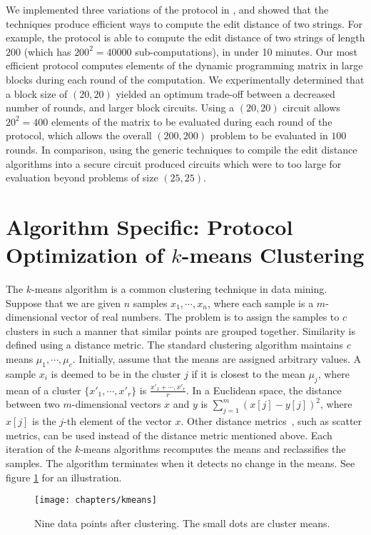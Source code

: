 We implemented three variations of the protocol in \cite{kruger07},
and showed that the techniques produce efficient ways to compute the
edit distance of two strings. For example, the protocol is able to
compute the edit distance of two strings of length $200$ (which has
$200^{2}=40000$ sub-computations), in under 10 minutes. Our most
efficient protocol computes elements of the dynamic programming matrix
in large blocks during each round of the computation. We experimentally
determined that a block size of $(20,20)$ yielded an optimum trade-off
between a decreased number of rounds, and larger block circuits. Using
a $(20,20)$ circuit allows $20^{2}=400$ elements of the matrix to
be evaluated during each round of the protocol, which allows the overall
$(200,200)$ problem to be evaluated in $100$ rounds. In comparison,
using the generic techniques to compile the edit distance algorithms
into a secure circuit produced circuits which were to too large for
evaluation beyond problems of size $(25,25)$.


\section{Algorithm Specific: Protocol Optimization of $k$-means Clustering}

The $k$-means algorithm is a common clustering technique in data
mining. Suppose that we are given $n$ samples $x_{1},\cdots,x_{n}$,
where each sample is a $m$-dimensional vector of real numbers. The
problem is to assign the samples to $c$ clusters in such a manner
that similar points are grouped together. Similarity is defined using
a distance metric. The standard clustering algorithm maintains $c$
means $\mu_{1},\cdots,\mu_{c}$. Initially, assume that the means
are assigned arbitrary values. A sample $x_{i}$ is deemed to be in
the cluster $j$ if it is closest to the mean $\mu_{j}$, where mean
of a cluster $\{x'_{1},\cdots,x'_{r}\}$ is $\frac{x'_{1}+\cdots,x'_{r}}{r}$.
In a Euclidean space, the distance between two $m$-dimensional vectors
$x$ and $y$ is $\sum_{j=1}^{m}(x[j]-y[j])^{2}$, where $x[j]$ is
the $j$-th element of the vector $x$. Other distance metrics~\cite[Chapter 10]{pattern-classification},
such as scatter metrics, can be used instead of the distance metric
mentioned above. Each iteration of the $k$-means algorithms recomputes
the means and reclassifies the samples. The algorithm terminates when
it detects no change in the means. See figure \ref{fig:clusters} for an
illustration.

%
\begin{figure}
\centering
\texttt{[image: chapters/kmeans]}

\caption{\label{fig:clusters}Nine data points after clustering. The small
dots are cluster means.}

\end{figure}


